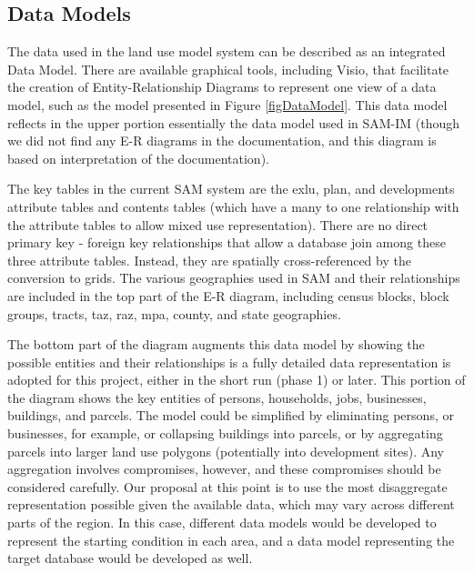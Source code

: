 \subsection{Data Models}
The data used in the land use model system can be described as an
integrated Data Model. There are available graphical tools,
including Visio, that facilitate the creation of Entity-Relationship
Diagrams to represent one view of a data model, such as the model
presented in Figure \ref{figDataModel}.  This data model reflects in
the upper portion essentially the data model used in SAM-IM (though
we did not find any E-R diagrams in the documentation, and this
diagram is based on interpretation of the documentation).

The key tables in the current SAM system are the exlu, plan, and developments attribute tables and
contents tables (which have a many to one relationship with the attribute tables to allow mixed use
representation).  There are no direct primary key - foreign key relationships that allow a database
join among these three attribute tables.  Instead, they are spatially cross-referenced by the
conversion to grids.  The various geographies used in SAM and their relationships are included
in the top part of the E-R diagram, including census blocks, block groups, tracts, taz, raz, mpa,
county, and state geographies.

The bottom part of the diagram augments this data model by showing the possible entities and their
relationships is a fully detailed data representation is adopted for this project, either in the
short run (phase 1) or later.  This portion of the diagram shows the key entities of persons,
households, jobs, businesses, buildings, and parcels.  The model could be simplified by eliminating
persons, or businesses, for example, or collapsing buildings into parcels, or by aggregating
parcels into larger land use polygons (potentially into development sites).  Any aggregation involves compromises, however, and these compromises should be considered carefully.  Our proposal at this point is to use the most disaggregate representation possible given the available data, which may vary across different parts of the region.  In this case, different data models would be developed to represent the
starting condition in each area, and a data model representing the target database would be developed
as well.


